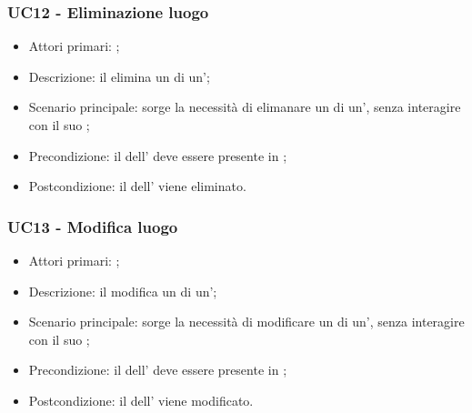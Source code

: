 \documentclass[../analisi-dei-requisiti]{subfiles}
\begin{document}
\subsubsection{UC12 - Eliminazione luogo}
\label{subsub:UC12}

\begin{itemize}
\item Attori primari: ;
\item Descrizione: il  elimina un  di un';
\item Scenario principale: sorge la necessità di elimanare un  di un', senza interagire con il suo ; 
\item Precondizione: il  dell' deve essere presente in ;
\item Postcondizione: il  dell' viene eliminato.

\end{itemize}

\subsubsection{UC13 - Modifica luogo}
\label{subsub:UC13}

\begin{itemize}
\item Attori primari: ;
\item Descrizione: il  modifica un  di un';
\item Scenario principale: sorge la necessità di modificare un  di un', senza interagire con il suo ; 
\item Precondizione: il  dell' deve essere presente in ;
\item Postcondizione: il  dell' viene modificato.

\end{itemize}

\end{document}
